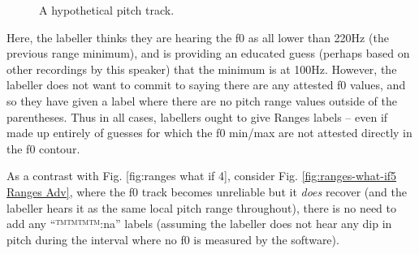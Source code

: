 \documentclass[11pt, twoside]{memoir}
\begin{document}
\begin{figure}[H]
\centering
{}
\caption{A hypothetical pitch track.%
\label{fig:ranges-what-if4 Ranges Adv}%
}
\end{figure}

Here, the labeller thinks they are hearing the f0 as all lower than 220Hz (the previous range minimum), and is providing an educated guess (perhaps based on other recordings by this speaker) that the minimum is at 100Hz. However, the labeller does not want to commit to saying there are any attested f0 values, and so they have given a label where there are no pitch range values outside of the parentheses. Thus in all cases, labellers ought to give Ranges labels – even if made up entirely of guesses for which the f0 min\slash max are not attested directly in the f0 contour.

As a contrast with Fig. [fig:ranges what if 4], consider Fig. \ref{fig:ranges-what-if5 Ranges Adv}, where the f0 track becomes unreliable but it \emph{does} recover (and the labeller hears it as the same local pitch range throughout), there is no need to add any “™™™™{:na}” labels (assuming the labeller does not hear any dip in pitch during the interval where no f0 is measured by the software).
\end{document}

